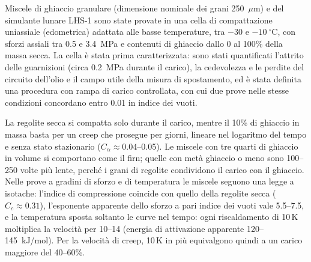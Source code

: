 \documentclass{Configuration_Files/PoliMi3i_thesis}
\begin{document}
Miscele di ghiaccio granulare (dimensione nominale dei grani 250~$\mu$m) e del simulante lunare LHS-1 sono state provate in una cella di compattazione uniassiale (edometrica) adattata alle basse temperature, tra $-30$ e $-10~^{\circ}$C, con sforzi assiali tra 0.5 e 3.4~MPa e contenuti di ghiaccio dallo 0 al 100\% della massa secca. La cella è stata prima caratterizzata: sono stati quantificati l'attrito delle guarnizioni (circa 0.2~MPa durante il carico), la cedevolezza e le perdite del circuito dell'olio e il campo utile della misura di spostamento, ed è stata definita una procedura con rampa di carico controllata, con cui due prove nelle stesse condizioni concordano entro 0.01 in indice dei vuoti.

La regolite secca si compatta solo durante il carico, mentre il 10\% di ghiaccio in massa basta per un creep che prosegue per giorni, lineare nel logaritmo del tempo e senza stato stazionario ($C_\alpha\approx0.04$--0.05). Le miscele con tre quarti di ghiaccio in volume si comportano come il firn; quelle con metà ghiaccio o meno sono 100--250 volte più lente, perché i grani di regolite condividono il carico con il ghiaccio. Nelle prove a gradini di sforzo e di temperatura le miscele seguono una legge a isotache: l'indice di compressione coincide con quello della regolite secca ($C_c\approx0.31$), l'esponente apparente dello sforzo a pari indice dei vuoti vale 5.5--7.5, e la temperatura sposta soltanto le curve nel tempo: ogni riscaldamento di 10\,K moltiplica la velocità per 10--14 (energia di attivazione apparente 120--145~kJ/mol). Per la velocità di creep, 10\,K in più equivalgono quindi a un carico maggiore del 40--60\%.
\end{document}

